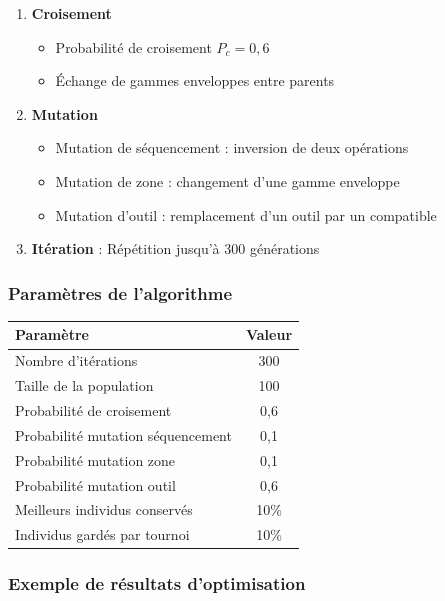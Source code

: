 \documentclass{article}
\begin{document}
\begin{table}[h]
\begin{enumerate}
    \item \textbf{Croisement}
    \begin{itemize}
        \item Probabilité de croisement $P_c = 0,6$
        \item Échange de gammes enveloppes entre parents
    \end{itemize}
    
    \item \textbf{Mutation}
    \begin{itemize}
        \item Mutation de séquencement : inversion de deux opérations
        \item Mutation de zone : changement d'une gamme enveloppe
        \item Mutation d'outil : remplacement d'un outil par un compatible
    \end{itemize}
    
    \item \textbf{Itération} : Répétition jusqu'à 300 générations
\end{enumerate}

\subsubsection{Paramètres de l'algorithme}

\begin{table}[h]
\centering
\begin{tabular}{|l|c|}
\hline
\textbf{Paramètre} & \textbf{Valeur} \\
\hline
Nombre d'itérations & 300 \\
Taille de la population & 100 \\
Probabilité de croisement & 0,6 \\
Probabilité mutation séquencement & 0,1 \\
Probabilité mutation zone & 0,1 \\
Probabilité mutation outil & 0,6 \\
Meilleurs individus conservés & 10\% \\
Individus gardés par tournoi & 10\% \\
\hline
\end{tabular}
\end{table}

\subsubsection{Exemple de résultats d'optimisation}


\end{table}
\end{document}
